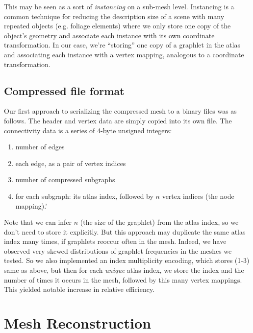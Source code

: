 \documentclass{egpubl}
\begin{document}

This may be seen as a sort of \textit{instancing} on a sub-mesh level. Instancing is a common technique for reducing the description size of a scene with many repeated objects (e.g. foliage elements) where we only store one copy of the object's geometry and associate each instance with its own coordinate transformation. In our case, we're ``storing'' one copy of a graphlet in the atlas and associating each instance with a vertex mapping, analogous to a coordinate transformation.

\subsection{Compressed file format}

Our first approach to serializing the compressed mesh to a binary files was as follows. The header and vertex data are simply copied into its own file. The connectivity data is a series of 4-byte unsigned integers:
\begin{enumerate}
        \item number of edges
        \item each edge, as a pair of vertex indices
        \item number of compressed subgraphs
        \item for each subgraph: its atlas index, followed by $n$ vertex indices (the node mapping).'
\end{enumerate}
Note that we can infer $n$ (the size of the graphlet) from the atlas index, so we don't need to store it explicitly. But this approach may duplicate the same atlas index many times, if graphlets reoccur often in the mesh. Indeed, we have observed very skewed distributions of graphlet frequencies in the meshes we tested.
So we also implemented an index multiplicity encoding, which stores (1-3) same as above, but then for each \textit{unique} atlas index, we store the index and the number of times it occurs in the mesh, followed by this many vertex mappings. This yielded notable increase in relative efficiency. %

\section{Mesh Reconstruction} \label{sec:reconstruction}
\end{document}

